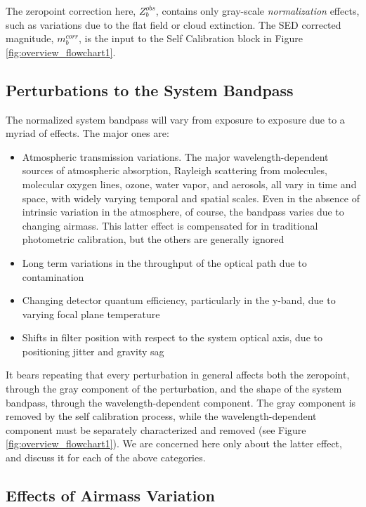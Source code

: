 \documentclass[12pt,preprint]{aastex}
\begin{document}
The zeropoint correction here, $Z_b^{obs}$, contains only gray-scale
{\it normalization} effects, such as variations due to the flat field
or cloud extinction.  The SED corrected magnitude, $m_b^{corr}$, is the input to the Self Calibration block in 
Figure \ref{fig:overview_flowchart1}.



\subsection{Perturbations to the System Bandpass}
The normalized system bandpass will vary from exposure to exposure due to a myriad of effects.  The major ones are:
\begin{itemize}
\item{Atmospheric transmission variations.  The major wavelength-dependent sources of atmospheric absorption, Rayleigh scattering from molecules, molecular oxygen lines, ozone, water vapor, and aerosols, all vary in time and space, with widely varying temporal and spatial scales.  Even in the absence of intrinsic variation in the atmosphere, of course, the bandpass varies due to changing airmass.  This latter effect is compensated for in traditional photometric calibration, but the others are generally ignored}
\item{Long term variations in the throughput of the optical path due to contamination}
\item{Changing detector quantum efficiency, particularly in the y-band, due to varying focal plane temperature}
\item{Shifts in filter position with respect to the system optical axis, due to positioning jitter and gravity sag}
\end{itemize}

It bears repeating that every perturbation in general affects both the zeropoint, through the gray component of the perturbation, and the shape of the system bandpass, through the wavelength-dependent component.  The gray component is removed by the self calibration process, while the wavelength-dependent component must be separately characterized and removed (see Figure \ref{fig:overview_flowchart1}).  We are concerned here only about the latter effect, and discuss it for each of the above categories.

\subsection{Effects of Airmass Variation}
\end{document}
